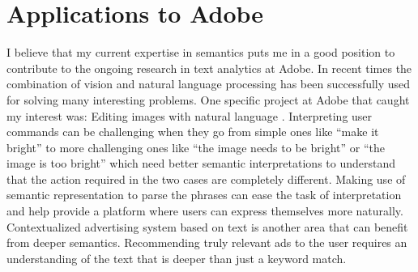\documentclass[11pt,a4paper]{article}
\begin{document}
\section{Applications to Adobe }
I believe that my current expertise in semantics puts me in a good position to contribute to the ongoing research in text analytics at Adobe. In recent times the combination of vision and natural language processing has been successfully used for solving many interesting problems. One specific project at Adobe that caught my interest was: Editing images with natural language \cite{laput2013pixeltone}. Interpreting user commands can be challenging when they go from simple ones like ``make it bright'' to more challenging ones like ``the image needs to be bright'' or ``the image is too bright'' which need better semantic interpretations to understand that the action required in the two cases are completely different. Making use of semantic representation to parse the phrases can ease the task of interpretation and help provide a platform where users can express themselves more naturally. Contextualized advertising system based on text is another area that can benefit from deeper semantics. Recommending truly relevant ads to the user requires an understanding of the text that is deeper than just a keyword match.  



\end{document}
